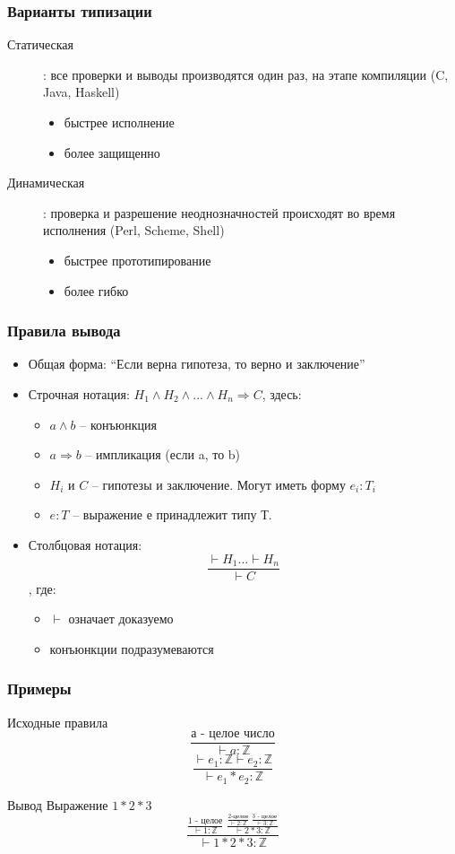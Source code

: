 \documentclass[16pt,pdf,unicode]{beamer}
\begin{document}
\begin{frame}
  \frametitle{Варианты типизации}
\begin{description}
\item[Статическая]: все проверки и выводы производятся один раз, на этапе компиляции (C, Java, Haskell)
  \begin{itemize}
    \item быстрее исполнение
    \item более защищенно
  \end{itemize}
\item[Динамическая]: проверка и разрешение неоднозначностей происходят во время исполнения (Perl, Scheme, Shell)
  \begin{itemize}
    \item быстрее прототипирование
    \item более гибко
  \end{itemize}
\end{description}
\end{frame}

\begin{frame}
  \frametitle{Правила вывода}
\begin{itemize}
  \item Общая форма: ``Если верна гипотеза, то верно и заключение''
  \item Строчная нотация: $H_1\land H_2\land ...\land H_n \Rightarrow C$, здесь:
    \begin{itemize}
      \item $a\land b$ -- конъюнкция
      \item $a\Rightarrow b$ -- импликация (если a, то b)
      \item $H_i$ и $C$ -- гипотезы и заключение. Могут иметь форму $e_i:T_i$
      \item $e:T$ -- выражение е принадлежит типу Т.
    \end{itemize}
  \item Столбцовая нотация:\[\frac{\vdash H_1 ... \vdash H_n}{\vdash C}\], где:
    \begin{itemize}
      \item $\vdash$ означает доказуемо
      \item конъюнкции подразумеваются
    \end{itemize}
\end{itemize}
\end{frame}

\begin{frame}
  \frametitle{Примеры}
\begin{block}{Исходные правила}
  \[\frac{\text{а - целое число}}{\vdash a:\mathbb{Z}}\]
  \[\frac{\vdash e_1:\mathbb{Z} \vdash e_2:\mathbb{Z}}{\vdash e_1*e_2:\mathbb{Z}}\]
\end{block}
\begin{block}{Вывод}
  Выражение $1 * 2 * 3$
  \huge{
  \[\frac{\frac{\text{1 - целое}}{\vdash 1:\mathbb{Z}}\ \frac{\frac{\text{2-целое}}{\vdash 2:\mathbb{Z}}\ \frac{\text{3 - целое}}{\vdash 3:\mathbb{Z}}}{\vdash 2 * 3 :\mathbb{Z}}}{\vdash 1 * 2 * 3 :\mathbb{Z}}\]}
\end{block}
\end{frame}
\end{document}
